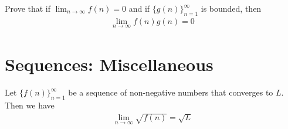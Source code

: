 \begin{exercise}
Prove that if $\lim_{n \longrightarrow \infty} f(n) = 0$ and if $\{g(n)\}_{n=1}^{\infty}$ is bounded, then 
\begin{align*}
    \lim_{n \longrightarrow \infty} f(n)g(n) = 0
\end{align*}
\end{exercise}

\newpage
\section{Sequences: Miscellaneous} 

\begin{theorem}
Let $\{f(n)\}_{n=1}^{\infty}$ be a sequence of non-negative numbers that converges to $L$. Then we have 
\begin{align*}
    \lim_{n \longrightarrow \infty} \sqrt{f(n)} = \sqrt{L}
\end{align*}
\label{limit_passes_under_square_root}
\end{theorem}